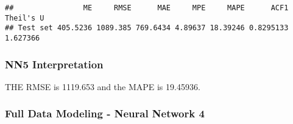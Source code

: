 \documentclass[
]{article}
\newenvironment{Shaded}{\begin{snugshade}}{\end{snugshade}}
\newcommand{\FunctionTok}[1]{\textcolor[rgb]{0.00,0.00,0.00}{#1}}
\newcommand{\NormalTok}[1]{#1}
\newcommand{\OtherTok}[1]{\textcolor[rgb]{0.56,0.35,0.01}{#1}}
\newcommand{\SpecialCharTok}[1]{\textcolor[rgb]{0.00,0.00,0.00}{#1}}
\begin{document}
\begin{Shaded}
\end{Shaded}

\begin{verbatim}
##                ME     RMSE      MAE     MPE     MAPE      ACF1 Theil's U
## Test set 405.5236 1089.385 769.6434 4.89637 18.39246 0.8295133  1.627366
\end{verbatim}

\begin{Shaded}
\end{Shaded}

\hypertarget{nn5-interpretation}{%
\subsubsection{NN5 Interpretation}\label{nn5-interpretation}}

THE RMSE is 1119.653 and the MAPE is 19.45936.

\hypertarget{full-data-modeling---neural-network-4}{%
\subsubsection{Full Data Modeling - Neural Network
4}\label{full-data-modeling---neural-network-4}}
\end{document}
